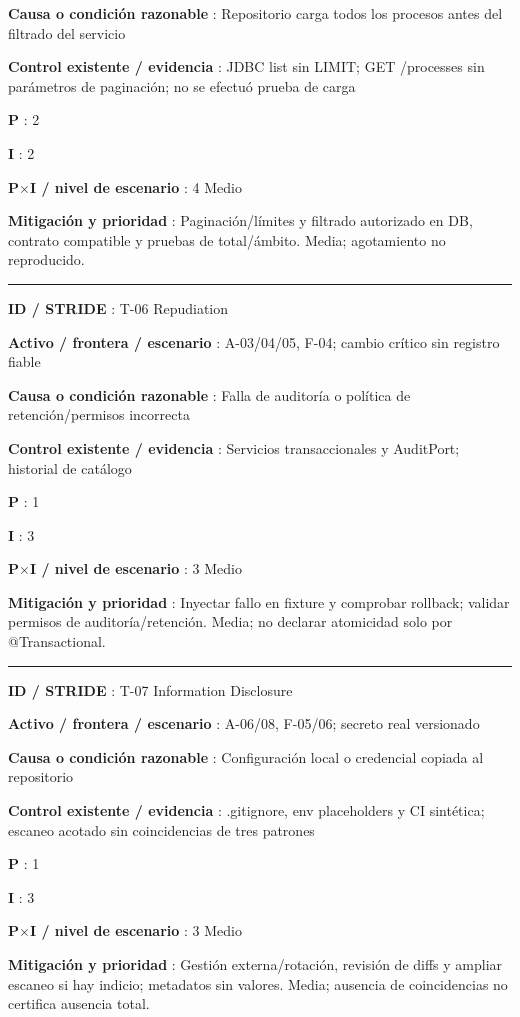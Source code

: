 \documentclass[12pt,a4paper]{report}
\begin{document}
\textbf{Causa o condición razonable }: Repositorio carga todos los
procesos antes del filtrado del servicio

\textbf{Control existente / evidencia }: JDBC list sin LIMIT; GET
/processes sin parámetros de paginación; no se efectuó prueba de carga

\textbf{P }: 2

\textbf{I }: 2

\textbf{P\ensuremath{\times}I / nivel de escenario }: 4 Medio

\textbf{Mitigación y prioridad }: Paginación/límites y filtrado
autorizado en DB, contrato compatible y pruebas de total/ámbito. Media;
agotamiento no reproducido.

\medskip\hrule\medskip

\textbf{ID / STRIDE }: T-06 Repudiation

\textbf{Activo / frontera / escenario }: A-03/04/05, F-04; cambio
crítico sin registro fiable

\textbf{Causa o condición razonable }: Falla de auditoría o política de
retención/permisos incorrecta

\textbf{Control existente / evidencia }: Servicios transaccionales y
AuditPort; historial de catálogo

\textbf{P }: 1

\textbf{I }: 3

\textbf{P\ensuremath{\times}I / nivel de escenario }: 3 Medio

\textbf{Mitigación y prioridad }: Inyectar fallo en fixture y comprobar
rollback; validar permisos de auditoría/retención. Media; no declarar
atomicidad solo por @Transactional.

\medskip\hrule\medskip

\textbf{ID / STRIDE }: T-07 Information Disclosure

\textbf{Activo / frontera / escenario }: A-06/08, F-05/06; secreto real
versionado

\textbf{Causa o condición razonable }: Configuración local o credencial
copiada al repositorio

\textbf{Control existente / evidencia }: .gitignore, env placeholders y
CI sintética; escaneo acotado sin coincidencias de tres patrones

\textbf{P }: 1

\textbf{I }: 3

\textbf{P\ensuremath{\times}I / nivel de escenario }: 3 Medio

\textbf{Mitigación y prioridad }: Gestión externa/rotación, revisión de
diffs y ampliar escaneo si hay indicio; metadatos sin valores. Media;
ausencia de coincidencias no certifica ausencia total.
\end{document}
